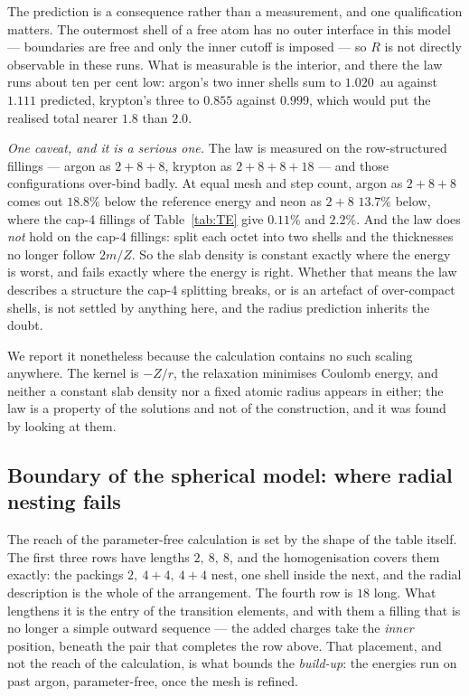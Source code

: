 \documentclass[11pt]{article}
\begin{document}
The prediction is a consequence rather than a measurement, and one qualification matters. The
outermost shell of a free atom has no outer interface in this model --- boundaries are free and only
the inner cutoff is imposed --- so $R$ is not directly observable in these runs. What is measurable
is the interior, and there the law runs about ten per cent low: argon's two inner shells sum to
$1.020$~au against $1.111$ predicted, krypton's three to $0.855$ against $0.999$, which would put the
realised total nearer $1.8$ than $2.0$.

\emph{One caveat, and it is a serious one.} The law is measured on the row-structured fillings ---
argon as $2{+}8{+}8$, krypton as $2{+}8{+}8{+}18$ --- and those configurations over-bind badly. At
equal mesh and step count, argon as $2{+}8{+}8$ comes out $18.8\%$ below the reference energy and neon
as $2{+}8$ $13.7\%$ below, where the cap-4 fillings of Table~\ref{tab:TE} give $0.11\%$ and $2.2\%$.
And the law does \emph{not} hold on the cap-4 fillings: split each octet into two shells and the
thicknesses no longer follow $2m/Z$. So the slab density is constant exactly where the energy is
worst, and fails exactly where the energy is right. Whether that means the law describes a structure
the cap-4 splitting breaks, or is an artefact of over-compact shells, is not settled by anything here,
and the radius prediction inherits the doubt.

We report it nonetheless because the calculation contains no such scaling anywhere. The kernel is
$-Z/r$, the relaxation minimises Coulomb energy, and neither a constant slab density nor a fixed
atomic radius appears in either; the law is a property of the solutions and not of the construction,
and it was found by looking at them.

\subsection{Boundary of the spherical model: where radial nesting fails}\label{sec:dblock}

The reach of the parameter-free calculation is set by the shape of the table itself. The first
three rows have lengths $2,\ 8,\ 8$, and the homogenisation covers them exactly: the packings
$2,\ 4{+}4,\ 4{+}4$ nest, one shell inside the next, and the radial description is the whole of
the arrangement. The fourth row is $18$ long. What lengthens it is the entry of the transition
elements, and with them a filling that is no longer a simple outward sequence --- the added
charges take the \emph{inner} position, beneath the pair that completes the row above. That
placement, and not the reach of the calculation, is what bounds the \emph{build-up}: the
energies run on past argon, parameter-free, once the mesh is refined.
\end{document}
